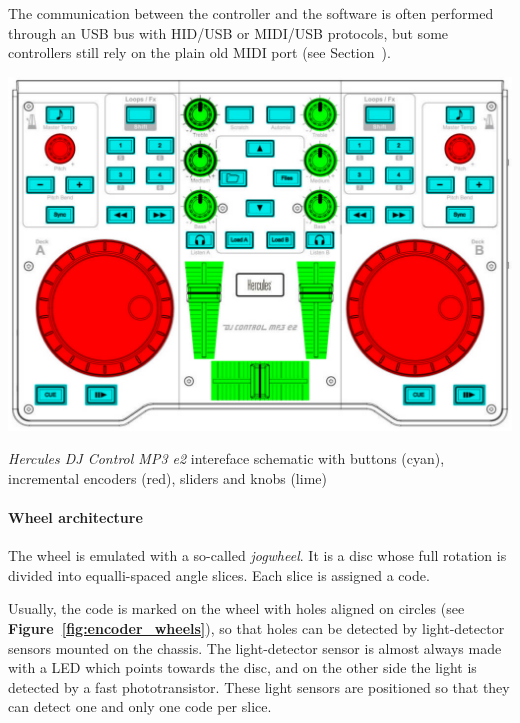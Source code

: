 \documentclass[a4paper,10pt]{article}
\makeatletter
\newenvironment{figurehere}{\def\@captype{figure}\vspace{2ex}}{\vspace{2ex}}
\makeatother
\begin{document}
\begin{multicols}{2}
The communication between the controller and the software is often performed
through an USB bus with HID/USB or MIDI/USB protocols, but some controllers
still rely on the plain old MIDI port (see Section~\CITEME).

\begin{figurehere}
	\label{fig:hercules_mp3e2_schematic}
	\centering
	\includegraphics[keepaspectratio=true,width=\columnwidth]{images/hercules_mp3e2_schematic.pdf}
	\caption{\emph{Hercules DJ Control MP3 e2}\cite{hercules_djcmp3e2}
	intereface schematic with buttons (cyan), incremental encoders (red),
	sliders and knobs (lime)}
\end{figurehere}


\paragraph{Wheel architecture}
The wheel is emulated with a so-called \emph{jogwheel}. It is a disc whose
full rotation is divided into equalli-spaced angle slices. Each slice is
assigned a code.

Usually, the code is marked on the wheel with holes aligned on circles (see
\textbf{Figure~\ref{fig:encoder_wheels}}), so that holes can be detected by
light-detector sensors mounted on the chassis. The light-detector sensor is
almost always made with a LED which points towards the disc, and on the other
side the light is detected by a fast phototransistor. These light sensors are
positioned so that they can detect one and only one code per slice.


\end{multicols}
\end{document}
